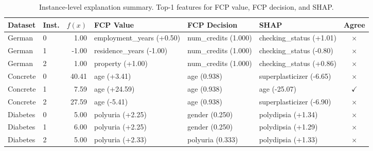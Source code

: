\begin{table}[ht]
  \centering
  \footnotesize
  \caption{Instance-level explanation summary. Top-1 features for FCP value, FCP decision, and SHAP.}
  \label{tab:instance-summary}
  \begin{tabular}{@{}llrp{2.5cm}p{2.5cm}p{2.5cm}c@{}}
    \toprule
    \textbf{Dataset} & \textbf{Inst.} & \textbf{$f(x)$} & \textbf{FCP Value} & \textbf{FCP Decision} & \textbf{SHAP} & \textbf{Agree} \\
    \midrule
    German & 0 & 1.00 & employment\_years (+0.50) & num\_credits (1.000) & checking\_status (+1.01) & $\times$ \\
    German & 1 & -1.00 & residence\_years (-1.00) & num\_credits (1.000) & checking\_status (-0.80) & $\times$ \\
    German & 2 & 1.00 & property (+1.00) & num\_credits (1.000) & checking\_status (+0.86) & $\times$ \\
    Concrete & 0 & 40.41 & age (+3.41) & age (0.938) & superplasticizer (-6.65) & $\times$ \\
    Concrete & 1 & 7.59 & age (+24.59) & age (0.938) & age (-25.07) & $\checkmark$ \\
    Concrete & 2 & 27.59 & age (-5.41) & age (0.938) & superplasticizer (-6.90) & $\times$ \\
    Diabetes & 0 & 5.00 & polyuria (+2.25) & gender (0.250) & polydipsia (+1.34) & $\times$ \\
    Diabetes & 1 & 6.00 & polyuria (+2.25) & gender (0.250) & polydipsia (+1.29) & $\times$ \\
    Diabetes & 2 & 5.00 & polyuria (+2.33) & polyuria (0.333) & polydipsia (+1.33) & $\times$ \\
    \bottomrule
  \end{tabular}
\end{table}